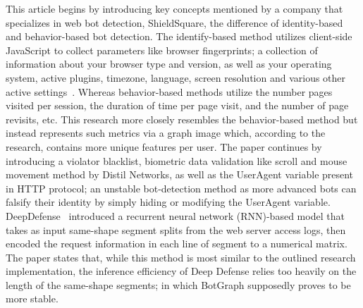 This article begins by introducing key concepts mentioned by a company that specializes in web bot detection, ShieldSquare, the difference of identity-based and behavior-based bot detection.
The identify-based method utilizes client-side JavaScript to collect parameters like browser fingerprints; a collection of information about your browser type and version, as well as your operating system, active plugins, timezone, language, screen resolution and various other active settings~\cite{browser_fingerprinting}.
Whereas behavior-based methods utilize the number pages visited per session, the duration of time per page visit, and the number of page revisits, etc.
This research more closely resembles the behavior-based method but instead represents such metrics via a graph image which, according to the research, contains more unique features per user.
The paper continues by introducing a violator blacklist, biometric data validation like scroll and mouse movement method by Distil Networks, as well as the UserAgent variable present in HTTP protocol; an unstable bot-detection method as more advanced bots can falsify their identity by simply hiding or modifying the UserAgent variable.
DeepDefense~\cite{deep_defense_article} introduced a recurrent neural network (RNN)-based model that takes as input same-shape segment splits from the web server access logs, then encoded the request information in each line of segment to a numerical matrix.
The paper states that, while this method is most similar to the outlined research implementation, the inference efficiency of Deep Defense relies too heavily on the length of the same-shape segments; in which BotGraph supposedly proves to be more stable.

